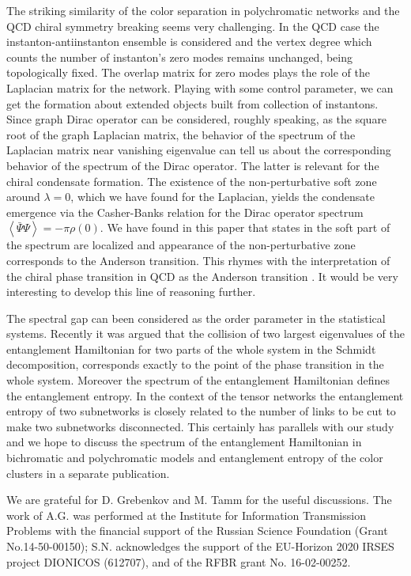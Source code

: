 \documentclass[aps,12pt]{revtex4}
\newcommand{\la}{\left<}
\newcommand{\ra}{\right>}
\begin{document}
The striking similarity of the color separation in polychromatic networks and the QCD chiral symmetry breaking seems very challenging. In the QCD case the instanton-antiinstanton ensemble is considered and the vertex degree which counts the number of instanton's zero modes remains unchanged, being topologically fixed. The overlap matrix for zero modes plays the role of the Laplacian matrix for the network. Playing with some control parameter, we can get the formation about extended objects built from collection of instantons. Since graph Dirac operator can be considered, roughly speaking, as the square root of the graph Laplacian matrix, the behavior of the spectrum of the Laplacian matrix near vanishing eigenvalue can tell us about the corresponding behavior of the spectrum of the Dirac operator. The latter is relevant for the chiral condensate formation. The existence of the non-perturbative soft zone around $\lambda=0$, which we have found for the Laplacian, yields the condensate emergence via the Casher-Banks relation for the Dirac operator spectrum $\la\bar{\Psi}\Psi\ra = - \pi \rho(0)$. We have found in this paper that states in the soft part of the spectrum are localized and appearance of the non-perturbative zone  corresponds to the Anderson transition. This rhymes with the interpretation of the chiral phase transition in QCD as the Anderson transition \cite{koscacz}. It would be very interesting to develop this line of reasoning further.

The spectral gap can been considered as the order parameter in the statistical systems. Recently it was argued that the collision of two largest eigenvalues of the entanglement Hamiltonian for two parts of the whole system in the Schmidt decomposition, corresponds exactly to the point of the phase transition in the whole system.  Moreover the spectrum of the entanglement Hamiltonian
defines the entanglement entropy. In the context of the tensor networks the entanglement entropy of two subnetworks is closely
related to the number of links to be cut to make two subnetworks disconnected. This certainly has parallels with our study
and we hope to discuss the spectrum of the entanglement Hamiltonian in bichromatic and polychromatic models and entanglement
entropy of the color clusters in a separate publication.

We are grateful for D. Grebenkov and M. Tamm for the useful discussions. The work of A.G. was performed at the Institute for Information Transmission Problems with the financial support of the Russian Science Foundation (Grant No.14-50-00150); S.N. acknowledges the support of the EU-Horizon 2020 IRSES project DIONICOS (612707), and of the RFBR grant No. 16-02-00252.
\end{document}
